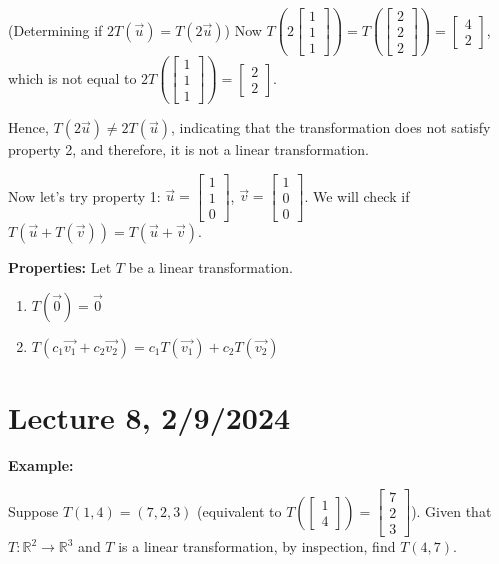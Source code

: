 \documentclass{article}
\begin{document}
(Determining if $2T(\vec{u}) = T(2\vec{u})$)
Now $T(2\begin{bmatrix} 1 \\ 1 \\ 1 \end{bmatrix}) = T\left(\begin{bmatrix} 2 \\ 2 \\ 2 \end{bmatrix}\right) = \begin{bmatrix} 4 \\ 2 \end{bmatrix}$, which is not equal to $2T\left(\begin{bmatrix} 1 \\ 1 \\ 1 \end{bmatrix}\right) = \begin{bmatrix} 2 \\ 2 \end{bmatrix}$. 

Hence, $T(2\vec{u}) \neq 2T(\vec{u})$, indicating that the transformation does not satisfy property 2, and therefore, it is not a linear transformation.

Now let's try property 1:
$\vec{u} = \begin{bmatrix} 1 \\ 1 \\ 0 \end{bmatrix}$, $\vec{v} = \begin{bmatrix} 1 \\ 0 \\ 0 \end{bmatrix}$. We will check if $T(\vec{u} + T(\vec{v})) = T(\vec{u} + \vec{v})$.


\textbf{Properties:} Let $T$ be a linear transformation.
\begin{enumerate}
    \item $T(\vec{0}) = \vec{0}$
    \item $T(c_1\vec{v_1} + c_2\vec{v_2}) = c_1T(\vec{v_1}) + c_2T(\vec{v_2})$
\end{enumerate}


\section{Lecture 8, 2/9/2024}

\textbf{Example:} 

Suppose \( T(1,4) = (7,2,3) \) (equivalent to \( T\left(\begin{bmatrix} 1 \\ 4 \end{bmatrix}\right) = \begin{bmatrix} 7 \\ 2 \\ 3 \end{bmatrix} \)).
 Given that $T: \mathbb{R}^2 \rightarrow \mathbb{R}^3$ and $T$ is a linear transformation, by inspection, find $T(4,7)$.
\medskip
\end{document}
